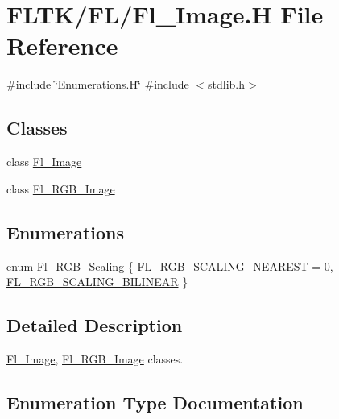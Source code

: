 \hypertarget{_fl___image_8_h}{}\section{F\+L\+T\+K/\+F\+L/\+Fl\+\_\+\+Image.H File Reference}
\label{_fl___image_8_h}
{\ttfamily \#include \char`\"{}Enumerations.\+H\char`\"{}}\newline
{\ttfamily \#include $<$stdlib.\+h$>$}\newline
\subsection*{Classes}
\begin{DoxyCompactItemize}
\item 
class \hyperlink{class_fl___image}{Fl\+\_\+\+Image}
\item 
class \hyperlink{class_fl___r_g_b___image}{Fl\+\_\+\+R\+G\+B\+\_\+\+Image}
\end{DoxyCompactItemize}
\subsection*{Enumerations}
\begin{DoxyCompactItemize}
\item 
enum \hyperlink{_fl___image_8_h_a79b21b0aede6293a7521b40ff6196368}{Fl\+\_\+\+R\+G\+B\+\_\+\+Scaling} \{ \hyperlink{_fl___image_8_h_a79b21b0aede6293a7521b40ff6196368ab3d220f85e1cde2e88ce74512e7a80af}{F\+L\+\_\+\+R\+G\+B\+\_\+\+S\+C\+A\+L\+I\+N\+G\+\_\+\+N\+E\+A\+R\+E\+ST} = 0, 
\hyperlink{_fl___image_8_h_a79b21b0aede6293a7521b40ff6196368ad4908fc3630eabed1601e67e18bcd179}{F\+L\+\_\+\+R\+G\+B\+\_\+\+S\+C\+A\+L\+I\+N\+G\+\_\+\+B\+I\+L\+I\+N\+E\+AR}
 \}
\end{DoxyCompactItemize}


\subsection{Detailed Description}
\hyperlink{class_fl___image}{Fl\+\_\+\+Image}, \hyperlink{class_fl___r_g_b___image}{Fl\+\_\+\+R\+G\+B\+\_\+\+Image} classes. 

\subsection{Enumeration Type Documentation}
\mbox{\label{_fl___image_8_h_a79b21b0aede6293a7521b40ff6196368}} 
